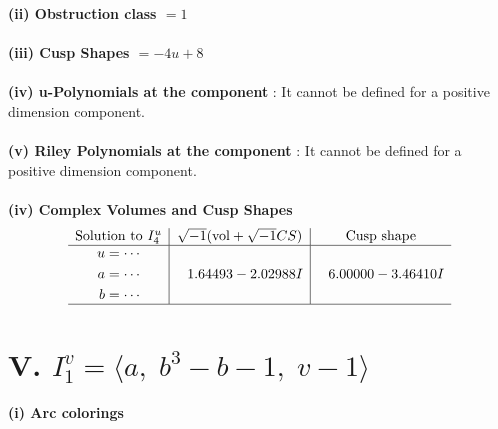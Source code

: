 \documentclass[1p]{elsarticle_modified}
\theoremstyle{definition}
\newcommand{\I}{\sqrt{-1}}
\begin{document}
\flushleft \textbf{(ii) Obstruction class $= 1$}\\~\\
\flushleft \textbf{(iii) Cusp Shapes $= -4 u+8$}\\~\\
\flushleft \textbf{(iv) u-Polynomials at the component} : It cannot be defined for a positive dimension component.\\~\\
\flushleft \textbf{(v) Riley Polynomials at the component} : It cannot be defined for a positive dimension component.\\~\\
\newpage\flushleft \textbf{(iv) Complex Volumes and Cusp Shapes}
$$\begin{array}{c|c|c} 
\text{Solution to }I^u_{4}& \I (\text{vol} + \sqrt{-1}CS) & \text{Cusp shape}\\
 \hline 
\begin{aligned}
u &= \cdots \\
a &= \cdots \\
b &= \cdots\end{aligned}
 & \phantom{-}1.64493 - 2.02988 I & \phantom{-}6.00000 - 3.46410 I\\
 \hline 
 \end{array}
$$\newpage\renewcommand{\arraystretch}{1}
\centering \section*{V. $I^v_{1}= \langle a,\;b^3- b-1,\;v-1 \rangle$}
\flushleft \textbf{(i) Arc colorings}\\
\end{document}
